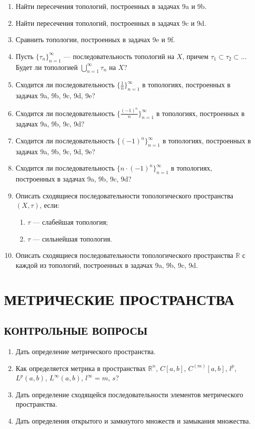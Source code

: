 \documentclass[12pt,a4paper]{article}
\begin{document}
\begin{enumerate}
\item Найти пересечения топологий, построенных в задачах 9a и 9b.
\item Найти пересечения топологий, построенных в задачах 9c и 9d.
\item Сравнить топологии, построенных в задачах 9e и 9f.

\item Пусть $\{\tau_{n}\}_{n=1}^{\infty}$ — последовательность топологий на $X$, причем $\tau_{1} \subset \tau_{2} \subset \dots$ Будет ли топологией $\bigcup_{n=1}^{\infty} \tau_{n}$ на $X$?

\item Сходится ли последовательность $\{\frac{1}{n}\}_{n=1}^{\infty}$ в топологиях, построенных в задачах 9a, 9b, 9c, 9d, 9e?

\item Сходится ли последовательность $\{\frac{(-1)^{n}}{n}\}_{n=1}^{\infty}$ в топологиях, построенных в задачах 9a, 9b, 9c, 9d?

\item Сходится ли последовательность $\{(-1)^{n}\}_{n=1}^{\infty}$ в топологиях, построенных в задачах 9a, 9b, 9c, 9d, 9e?

\item Сходится ли последовательность $\{n \cdot (-1)^{n}\}_{n=1}^{\infty}$ в топологиях, построенных в задачах 9a, 9b, 9c, 9d?

\item Описать сходящиеся последовательности топологического пространства $(X, \tau)$, если:
\begin{enumerate}[label=\alph*)]
\item $\tau$ — слабейшая топология;
\item $\tau$ — сильнейшая топология.
\end{enumerate}

\item Описать сходящиеся последовательности топологического пространства $\mathbb{R}$ с каждой из топологий, построенных в задачах 9a, 9b, 9c, 9d.
\end{enumerate}

\section{МЕТРИЧЕСКИЕ ПРОСТРАНСТВА}

\subsection*{КОНТРОЛЬНЫЕ ВОПРОСЫ}
\begin{enumerate}
\item Дать определение метрического пространства.
\item Как определяется метрика в пространствах $\mathbb{R}^{n}$, $C[a, b]$, $C^{(m)}[a, b]$, $l^{p}$, $L^{p}(a, b)$, $L^{\infty}(a, b)$, $l^{\infty}=m$, $s$?
\item Дать определение сходящейся последовательности элементов метрического пространства.
\item Дать определения открытого и замкнутого множеств и замыкания множества.
\end{enumerate}
\end{document}
